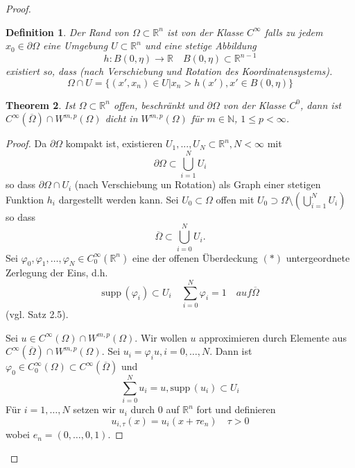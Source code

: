 \documentclass[
paper=a4,
bibtotocnumbered,
liststotocnumbered,
tablecaptionabove,
pointlessnumbers,
twoside,
openright,
10pt
]
{report}
\newcommand{\supp}{\mathrm{supp}\,}
\let\phi\varphi
\newtheorem{thm}{Theorem}[chapter]
\newtheorem{df}[thm]{Definition}
\theoremstyle{definition}
\numberwithin{equation}{chapter}
\begin{document}
\begin{proof}
\begin{df}
 Der Rand von $\Omega\subset \mathbb R^n$ ist von der Klasse $C^\infty$ falls zu jedem $x_0 \in \partial \Omega$ eine Umgebung $U\subset \mathbb R^n$ und eine stetige Abbildung
 \begin{equation}
  h: B(0, \eta) \to \mathbb R \quad B(0,\eta) \subset \mathbb R^{n-1}
 \end{equation}
existiert so, dass (nach Verschiebung und Rotation des Koordinatensystems).
\begin{equation}
 \Omega \cap U = \{ (x', x_n) \in U| x_n >h(x') , x'\in B(0, \eta)\}
\end{equation}
\end{df}
\begin{thm}\label{thm3.9}
 Ist $\Omega \subset \mathbb R^n$ offen, beschränkt und $\partial \Omega$ von der Klasse $C^0$, dann ist $C^\infty(\overline{\Omega}) \cap W^{m,p}(\Omega)$ dicht in $W^{m,p}(\Omega)$ für $m\in \mathbb N$, $1\le p <\infty$.
\end{thm}

\begin{proof}
Da $\partial \Omega$ kompakt ist, existieren $U_1,..., U_N \subset \mathbb R^n, N<\infty$ mit
\begin{equation}
 \partial \Omega \subset \bigcup_{i=1}^N U_i
\end{equation}
so dass $\partial\Omega \cap U_i$ (nach Verschiebung un Rotation) als Graph einer stetigen Funktion $h_i$ dargestellt werden kann. Sei $U_0\subset \Omega$ offen mit $U_0\supset \Omega \setminus (\bigcup_{i=1}^N U_i)$ so dass
\begin{equation}\label{3.9kompakt}
 \overline{\Omega} \subset \bigcup_{i=0}^N U_i.
\end{equation}
Sei $\phi_0, \phi_1,\ldots, \phi_N \in C_0^\infty(\mathbb R^n)$ eine der offenen Überdeckung $(*)$ untergeordnete Zerlegung der Eins, d.h.
\begin{equation}
 \supp(\phi_i) \subset U_i \quad \sum_{i=0}^N \phi_i =1 \quad{auf } \overline{\Omega}
\end{equation}
(vgl. Satz 2.5).

Sei $u\in C^\infty(\Omega) \cap W^{m,p}(\Omega)$. Wir wollen $u$ approximieren durch Elemente aus $C^\infty(\overline{\Omega})\cap W^{m,p}(\Omega)$.  Sei $u_i = \phi_i u, i=0,\ldots, N$.  Dann ist $\phi_0 \in C_0^\infty(\Omega) \subset C^\infty(\overline{\Omega})$ und 
\begin{equation}
 \sum_{i=0}^N u_i = u, \supp(u_i) \subset U_i
\end{equation}
Für $i=1,\ldots, N$ setzen wir $u_i$ durch $0$ auf $\mathbb R^n$ fort und definieren
\begin{equation}
 u_{i,\tau}(x) =u_i(x+ \tau e_n) \quad \tau >0
\end{equation}
wobei $e_n=(0,\ldots,0,1)$.


\end{proof}
\end{proof}
\end{document}
